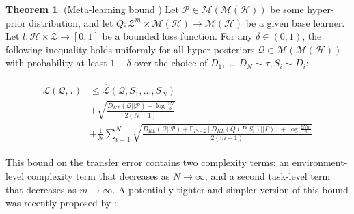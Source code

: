 \documentclass{article}
\theoremstyle{definition}
\newtheorem{theorem}{Theorem}[section]
\newcommand{\Expect}[2]{\mathbb{E}_{#1}\left [#2 \right ]}
\begin{document}
\begin{theorem} (Meta-learning bound \citep{Amit2018}) \label{thm:meta-pb}
	Let $\mathcal{P}\in \mathcal{M}(\mathcal{M}(\mathcal{H}))$ be some hyper-prior distribution, and let $Q: \mathcal{Z}^m\times\mathcal{M}(\mathcal{H})\rightarrow \mathcal{M}(\mathcal{H})$ be a given base learner. Let $l: \mathcal{H}\times \mathcal{Z}\rightarrow [0, 1]$ be a bounded loss function.
	For any $\delta \in (0,1)$, the following inequality holds uniformly for all hyper-posteriors $\mathcal{Q}\in \mathcal{M}(\mathcal{M}(\mathcal{H}))$ with probability at least $1-\delta$ over the choice of $D_1,...,D_N\sim \tau, S_i\sim D_i$:
	
	\begin{align} \label{eq:meta-pb-amit}
	\begin{split}
	\mathcal{L}(\mathcal{Q}, \tau) &\leq \hat{\mathcal{L}}(\mathcal{Q}, S_1,...,S_N) \\
	&+\sqrt{\frac{D_{KL}(\mathcal{Q}||\mathcal{P})+\log\frac{2N}{\delta}}{2(N-1)}} \\
	&+\frac{1}{N}\sum_{i=1}^{N}\sqrt{\frac{D_{KL}(\mathcal{Q}||\mathcal{P})+\Expect{P\sim \mathcal{Q}}{D_{KL}(Q(P,S_i)||P)}+\log\frac{2Nm}{\delta}}{2(m-1)}}
	\end{split}
	\end{align}
	
\end{theorem}

This bound on the transfer error contains two complexity terms: an environment-level complexity term that decreases as $N\rightarrow \infty$, and a second task-level term that decreases as $m\rightarrow \infty$. A potentially tighter and simpler version of this bound was recently proposed by \cite{Rothfuss2020}:
\end{document}
